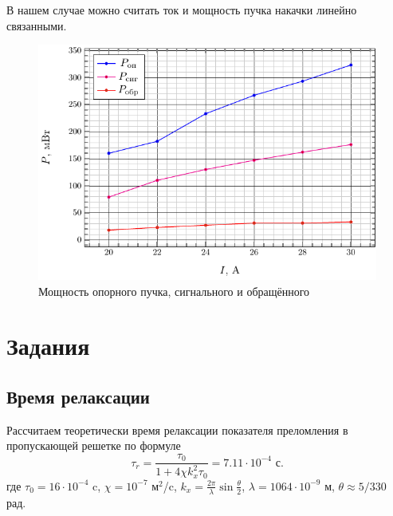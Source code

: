 \documentclass[a5paper,11pt]{extarticle}
\begin{document}
В нашем случае можно считать ток и мощность пучка накачки линейно связанными.
\begin{figure}[H]
	\centering
	\includegraphics[]{fig/fig}
	\caption{Мощность опорного пучка, сигнального и обращённого}
	\label{fig:1}
\end{figure}



\section{Задания}
\subsection{Время релаксации}
Рассчитаем теоретически время релаксации показателя преломления в пропускающей решетке по формуле
\begin{equation}
	\tau_{r}=\frac{\tau_{0}}{1+4 \chi k_{x}^{2} \tau_{0}} = 7.11 \cdot 10^{-4} \text{ с}.
\end{equation}
где $\tau_0 = 16\cdot10^{-4}$ c, $\chi = 10^{-7}$ м${^2}$/c, $k_x = \frac{2\pi}{\lambda}\sin\frac{\theta}{2}$, $\lambda = 1064 \cdot 10^{-9}$ м, $\theta \approx 5/330$ рад.
\end{document}
